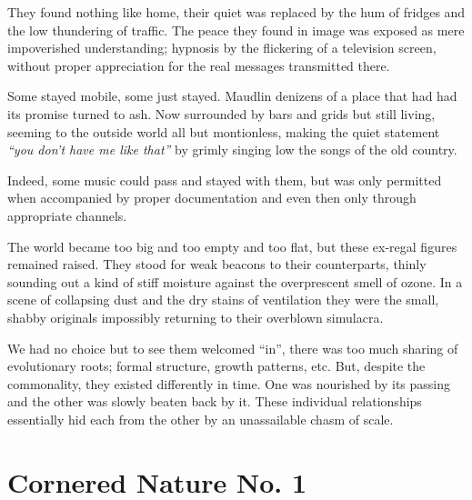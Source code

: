 \documentclass{book}
\begin{document}
They found nothing like home, their quiet was replaced by the hum of fridges
and the low thundering of traffic. The peace they found in image was exposed as
mere impoverished understanding; hypnosis by the flickering of a television
screen, without proper appreciation for the real messages transmitted there.

Some stayed mobile, some just stayed. Maudlin denizens of a place that had had
its promise turned to ash. Now surrounded by bars and grids but still living,
seeming to the outside world all but montionless, making the quiet statement
\emph{``you don't have me like that''} by grimly singing low the songs of the
old country.

Indeed, some music could pass and stayed with them, but was only permitted when
accompanied by proper documentation and even then only through appropriate
channels.

The world became too big and too empty and too flat, but these ex-regal figures
remained raised. They stood for weak beacons to their counterparts, thinly
sounding out a kind of stiff moisture against the overprescent smell of ozone.
In a scene of collapsing dust and the dry stains of ventilation they were the
small, shabby originals impossibly returning to their overblown simulacra.

We had no choice but to see them welcomed ``in'', there was too much sharing of
evolutionary roots; formal structure, growth patterns, etc. But, despite the
commonality, they existed differently in time. One was nourished by its passing
and the other was slowly beaten back by it. These individual relationships
essentially hid each from the other by an unassailable chasm of scale.

\chapter{Cornered Nature No. 1}
\end{document}
